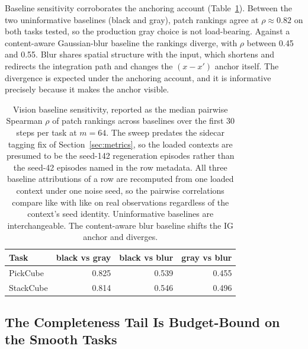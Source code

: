 \documentclass{article}
\begin{document}
Baseline sensitivity corroborates the anchoring account (Table~\ref{tab:baseline}).
Between the two uninformative baselines (black and gray), patch rankings agree at $\rho \approx 0.82$ on both tasks tested, so the production gray choice is not load-bearing.
Against a content-aware Gaussian-blur baseline the rankings diverge, with $\rho$ between 0.45 and 0.55.
Blur shares spatial structure with the input, which shortens and redirects the integration path and changes the $(x - x')$ anchor itself.
The divergence is expected under the anchoring account, and it is informative precisely because it makes the anchor visible.

\begin{table}[t!]
\centering
\small
\begin{tabular}{@{}l rrr@{}}
\toprule
\textbf{Task} & \textbf{black vs gray} & \textbf{black vs blur} & \textbf{gray vs blur} \\
\midrule
PickCube & 0.825 & 0.539 & 0.455 \\
\rowcolor{gray!6}
StackCube & 0.814 & 0.546 & 0.496 \\
\bottomrule
\end{tabular}
\caption{Vision baseline sensitivity, reported as the median pairwise Spearman $\rho$ of patch rankings across baselines over the first 30 steps per task at $m{=}64$. The sweep predates the sidecar tagging fix of Section~\ref{sec:metrics}, so the loaded contexts are presumed to be the seed-142 regeneration episodes rather than the seed-42 episodes named in the row metadata. All three baseline attributions of a row are recomputed from one loaded context under one noise seed, so the pairwise correlations compare like with like on real observations regardless of the context's seed identity. Uninformative baselines are interchangeable. The content-aware blur baseline shifts the IG anchor and diverges.}
\label{tab:baseline}
\end{table}

\subsection{The Completeness Tail Is Budget-Bound on the Smooth Tasks}
\label{sec:budget}
\end{document}
